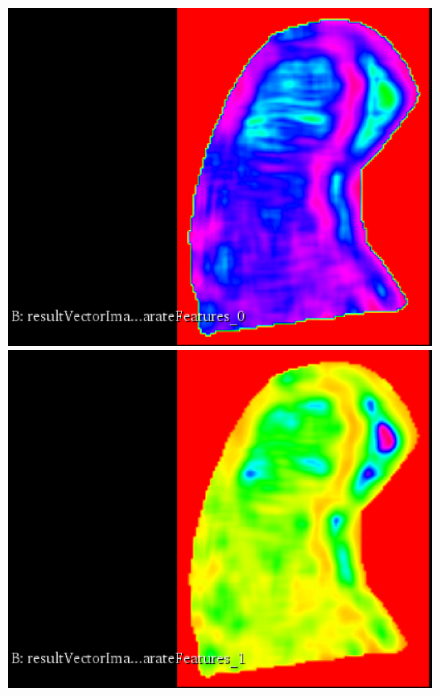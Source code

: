 \documentclass{InsightArticle}
\begin{document}
\begin{figure}[H]
  \begin{center}
    \includegraphics[scale=0.3]{figures/ShortRunEmphasis.eps}
    \includegraphics[scale=0.3]{figures/LongRunEmphasis.eps}

\end{center}
\end{figure}
\end{document}
